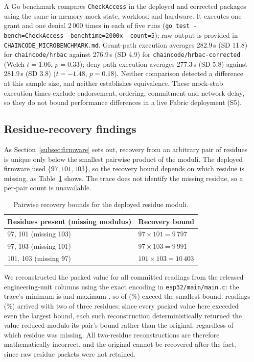 \documentclass[a4paper,fleqn]{cas-sc}
\begin{document}
A Go benchmark compares \texttt{CheckAccess} in the deployed and corrected
packages using the same in-memory mock state, workload and hardware. It
executes one grant and one denial 2\,000 times in each of five runs
(\texttt{go test -bench=CheckAccess -benchtime=2000x -count=5}); raw output
is provided in \texttt{CHAINCODE\_MICROBENCHMARK.md}. Grant-path
execution averages 282.9\,\textmu{}s (SD 11.8) for \texttt{chaincode/hrbac}
against 276.9\,\textmu{}s (SD 4.9) for \texttt{chaincode/hrbac-corrected}
(Welch $t=1.06$, $p=0.33$); deny-path execution averages 277.3\,\textmu{}s
(SD 5.8) against 281.9\,\textmu{}s (SD 3.8) ($t=-1.48$, $p=0.18$).
Neither comparison detected a difference at this sample size, and neither
establishes equivalence. These mock-stub execution times exclude endorsement,
ordering, commitment and network delay, so they do not bound performance
differences in a live Fabric deployment (S5).

\subsection{Residue-recovery findings}
\label{subsec:pm_crt}

As Section~\ref{subsec:firmware} sets out, recovery from an arbitrary pair
of residues is unique only below the smallest pairwise product of the
moduli. The deployed firmware used $\{97, 101, 103\}$, so the recovery
bound depends on which residue is missing, as Table~\ref{tab:crtpairs}
shows. The trace does not identify the missing residue, so a per-pair count
is unavailable.

\begin{table}[t]
\caption{Pairwise recovery bounds for the deployed residue moduli.}
\label{tab:crtpairs}
\small
\begin{tabularx}{\columnwidth}{@{}lX@{}}
\toprule
Residues present (missing modulus) & Recovery bound \\
\midrule
97, 101 (missing 103) & $97\times 101 = 9\,797$ \\
97, 103 (missing 101) & $97\times 103 = 9\,991$ \\
101, 103 (missing 97) & $101\times 103 = 10\,403$ \\
\bottomrule
\end{tabularx}
\end{table} We reconstructed the packed
value for all \CRTExceedN{} committed readings from the released
engineering-unit columns using the exact encoding in
\texttt{esp32/main/main.c}: the trace's minimum is \CRTPackedMin{} and
maximum \CRTPackedMax{}, so \CRTExceedCount{} of \CRTExceedN{}
(\CRTExceedPct\%) exceed the smallest bound. \CRTRecovered{} readings
(\CRTLossRatePct\%) arrived with two of three residues; since every
packed value here exceeded even the largest bound, each such
reconstruction deterministically returned the value reduced modulo its
pair's bound rather than the original, regardless of which residue was
missing. All \CRTRecovered{} two-residue reconstructions are therefore
mathematically incorrect, and the original cannot be recovered after the
fact, since raw residue packets were not retained.
\end{document}
